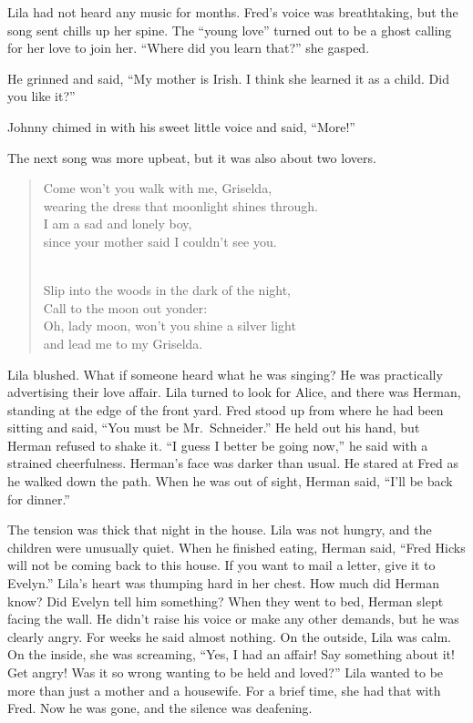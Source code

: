\documentclass[
  american,
  letterpaper,
]{book}
\begin{document}
Lila had not heard any music for months. Fred's voice was breathtaking,
but the song sent chills up her spine. The ``young love'' turned out to
be a ghost calling for her love to join her. ``Where did you learn
that?'' she gasped.

He grinned and said, ``My mother is Irish. I think she learned it as a
child. Did you like it?''

Johnny chimed in with his sweet little voice and said, ``More!''

The next song was more upbeat, but it was also about two lovers.

\begin{quote}
Come won't you walk with me, Griselda,\\
wearing the dress that moonlight shines through.\\
I am a sad and lonely boy,\\
since your mother said I couldn't see you.\\
\strut \\
Slip into the woods in the dark of the night,\\
Call to the moon out yonder:\\
Oh, lady moon, won't you shine a silver light\\
and lead me to my Griselda.
\end{quote}

Lila blushed. What if someone heard what he was singing? He was
practically advertising their love affair. Lila turned to look for
Alice, and there was Herman, standing at the edge of the front yard.
Fred stood up from where he had been sitting and said, ``You must be
Mr.~Schneider.'' He held out his hand, but Herman refused to shake it.
``I guess I better be going now,'' he said with a strained cheerfulness.
Herman's face was darker than usual. He stared at Fred as he walked down
the path. When he was out of sight, Herman said, ``I'll be back for
dinner.''

The tension was thick that night in the house. Lila was not hungry, and
the children were unusually quiet. When he finished eating, Herman said,
``Fred Hicks will not be coming back to this house. If you want to mail
a letter, give it to Evelyn.'' Lila's heart was thumping hard in her
chest. How much did Herman know? Did Evelyn tell him something? When
they went to bed, Herman slept facing the wall. He didn't raise his
voice or make any other demands, but he was clearly angry. For weeks he
said almost nothing. On the outside, Lila was calm. On the inside, she
was screaming, ``Yes, I had an affair! Say something about it! Get
angry! Was it so wrong wanting to be held and loved?'' Lila wanted to be
more than just a mother and a housewife. For a brief time, she had that
with Fred. Now he was gone, and the silence was deafening.
\end{document}
